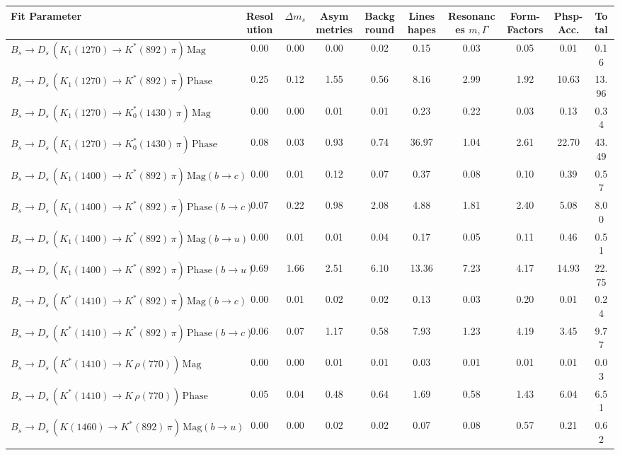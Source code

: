 \begin{tabular}{l  c  c  c  c  c  c  c  c  | c }
\hline
\hline
Fit Parameter & Resolution & $\Delta m_{s}$ & Asymmetries & Background & Lineshapes & Resonances $m, \Gamma$ & Form-Factors & Phsp-Acc. &  Total  \\ 
\hline
$B_s \to D_s \, ( K_1(1270) \to K^{*}(892) \, \pi ) \, \text{Mag}$ & 0.00 & 0.00 & 0.00 & 0.02 & 0.15 & 0.03 & 0.05 & 0.01 & 0.16 \\ 
$B_s \to D_s \, ( K_1(1270) \to K^{*}(892) \, \pi ) \, \text{Phase}$ & 0.25 & 0.12 & 1.55 & 0.56 & 8.16 & 2.99 & 1.92 & 10.63 & 13.96 \\ 
$B_s \to D_s \, ( K_1(1270) \to K^{*}_{0}(1430) \, \pi ) \, \text{Mag} $ & 0.00 & 0.00 & 0.01 & 0.01 & 0.23 & 0.22 & 0.03 & 0.13 & 0.34 \\ 
$B_s \to D_s \, ( K_1(1270) \to K^{*}_{0}(1430) \, \pi ) \, \text{Phase} $ & 0.08 & 0.03 & 0.93 & 0.74 & 36.97 & 1.04 & 2.61 & 22.70 & 43.49 \\ 
$B_s \to D_s \, ( K_1(1400) \to K^{*}(892) \, \pi ) \, \text{Mag} (b \to c)$ & 0.00 & 0.01 & 0.12 & 0.07 & 0.37 & 0.08 & 0.10 & 0.39 & 0.57 \\ 
$B_s \to D_s \, ( K_1(1400) \to K^{*}(892) \, \pi ) \, \text{Phase} (b \to c)$ & 0.07 & 0.22 & 0.98 & 2.08 & 4.88 & 1.81 & 2.40 & 5.08 & 8.00 \\ 
$B_s \to D_s \, ( K_1(1400) \to K^{*}(892) \, \pi ) \, \text{Mag} (b \to u)$ & 0.00 & 0.01 & 0.01 & 0.04 & 0.17 & 0.05 & 0.11 & 0.46 & 0.51 \\ 
$B_s \to D_s \, ( K_1(1400) \to K^{*}(892) \, \pi ) \, \text{Phase} (b \to u)$ & 0.69 & 1.66 & 2.51 & 6.10 & 13.36 & 7.23 & 4.17 & 14.93 & 22.75 \\ 
$B_s \to D_s \, ( K^{*}(1410) \to K^{*}(892) \, \pi ) \, \text{Mag} (b \to c)$ & 0.00 & 0.01 & 0.02 & 0.02 & 0.13 & 0.03 & 0.20 & 0.01 & 0.24 \\ 
$B_s \to D_s \, ( K^{*}(1410) \to K^{*}(892) \, \pi ) \, \text{Phase} (b \to c)$ & 0.06 & 0.07 & 1.17 & 0.58 & 7.93 & 1.23 & 4.19 & 3.45 & 9.77 \\ 
$B_s \to D_s \, ( K^{*}(1410) \to K \, \rho(770) ) \, \text{Mag}$ & 0.00 & 0.00 & 0.01 & 0.01 & 0.03 & 0.01 & 0.01 & 0.01 & 0.03 \\ 
$B_s \to D_s \, ( K^{*}(1410) \to K \, \rho(770) ) \, \text{Phase}$ & 0.05 & 0.04 & 0.48 & 0.64 & 1.69 & 0.58 & 1.43 & 6.04 & 6.51 \\ 
$B_s \to D_s \, ( K(1460) \to K^{*}(892) \, \pi ) \, \text{Mag} (b \to u)$ & 0.00 & 0.00 & 0.02 & 0.02 & 0.07 & 0.08 & 0.57 & 0.21 & 0.62 \\ 

\end{tabular}

